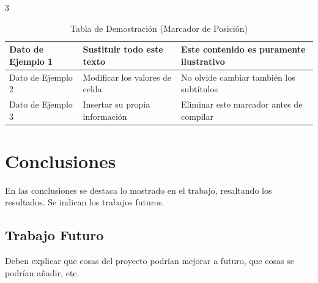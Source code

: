 \documentclass[a0,portrait]{a0poster}
\begin{document}
\begin{multicols}{3}
\begin{table}[htbp]
\begin{tabular}{|p{7cm}|p{7cm}|p{7cm}|}
        Dato de Ejemplo 1 & Sustituir todo este texto & Este contenido es puramente ilustrativo \\\hline
        Dato de Ejemplo 2 & Modificar los valores de celda & No olvide cambiar también los subtítulos \\\hline
        Dato de Ejemplo 3 & Insertar su propia información & Eliminar este marcador antes de compilar \\\hline
    \end{tabular}
    \caption{Tabla de Demostración (Marcador de Posición)}
    \label{tabla1}
\end{table}



\section*{Conclusiones}

En las conclusiones se destaca lo mostrado en el trabajo, resaltando los resultados. Se indican los trabajos futuros.

\subsection*{Trabajo Futuro}

Deben explicar que cosas del proyecto podrían mejorar a futuro, que cosas se podrían añadir, etc.

\color{celeste}





\end{multicols}

\end{document}
